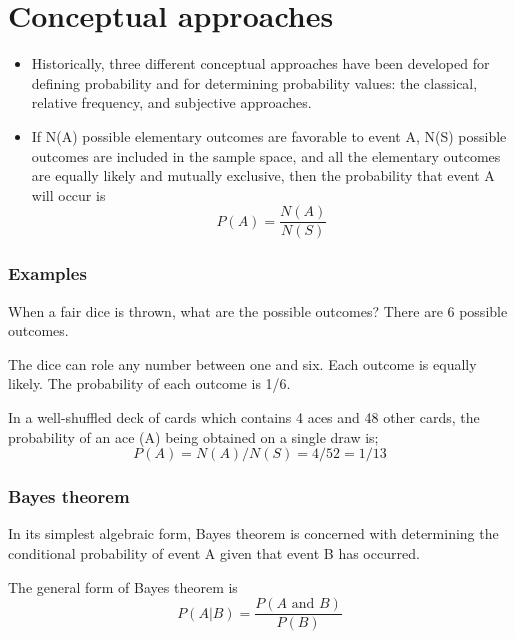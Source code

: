 \documentclass{beamer}
\begin{document}
\section*{Conceptual approaches}
\begin{frame}
\Large
\begin{itemize}
\item Historically, three different conceptual approaches have been developed for defining probability and for
determining probability values: the classical, relative frequency, and subjective approaches.\item If N(A) possible elementary outcomes are favorable to event A,
N(S) possible outcomes are included in the sample space, and all the elementary outcomes are equally likely and
mutually exclusive, then the probability that event A will occur is
\[P(A) = \frac{N(A)}{N(S)}\]
\end{itemize}
\end{frame}
\begin{frame} \frametitle{Examples}
\Large
When a fair dice is thrown, what are the possible outcomes? There are 6 possible outcomes. 

The dice can role any number between one and six. Each outcome is equally likely. The probability of each outcome is 1/6.
\end{frame}
\begin{frame} 

\Large
In a well-shuffled deck of cards which contains 4 aces and 48 other cards, the probability of an ace (A)
being obtained on a single draw is;
\[ P(A)= N(A)/ N(S) = 4/52 = 1/13 \]
\end{frame}
\begin{frame} 

\frametitle{Bayes theorem}
\Large
In its simplest algebraic form, Bayes theorem is concerned with determining the conditional probability of
event A given that event B has occurred. 

The general form of Bayes theorem is
\[ P(A|B) =
\frac{P(A \mbox{ and }B)}{P(B)} \]
\end{frame}
\end{document}
